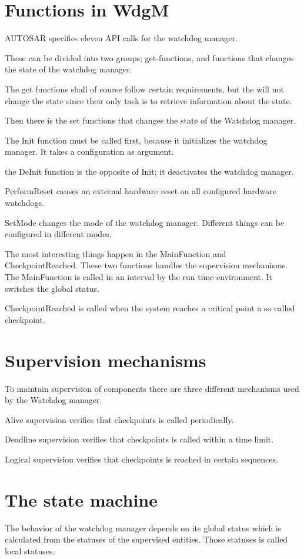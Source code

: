 \documentclass[a4paper]{article}
\begin{document}
\section{Functions in WdgM}
AUTOSAR specifies eleven API calls for the watchdog manager.

These can be divided into two groups; get-functions, and functions
that changes the state of the watchdog manager.

The get functions shall of course follow certain requirements, but the
will not change the state since their only task is to retrieve
information about the state.

Then there is the set functions that changes the state of the Watchdog
manager.

The Init function must be called first, because it initializes the
watchdog manager. It takes a configuration as argument.

the DeInit function is the opposite of Init; it deactivates the
watchdog manager.

PerformReset causes an external hardware reset on all configured
hardware watchdogs.

SetMode changes the mode of the watchdog manager. Different things can
be configured in different modes.

The most interesting things happen in the MainFunction and
CheckpointReached. These two functions handles the supervision mechanisms.
The MainFunction is called in an interval by the run time environment.
It switches the global status.

CheckpointReached is called when the system reaches a critical point a
so called checkpoint.

\section{Supervision mechanisms}
To maintain supervision of components there are three different
mechanisms used by the Watchdog manager.

Alive supervision verifies that checkpoints is called periodically.

Deadline supervision verifies that checkpoints is called within a time
limit.

Logical supervision verifies that checkpoints is reached in certain sequences.

\section{The state machine}
The behavior of the watchdog manager depends on its global status
which is calculated from the statuses of the supervised
entities. Those statuses is called local statuses.
\end{document}
